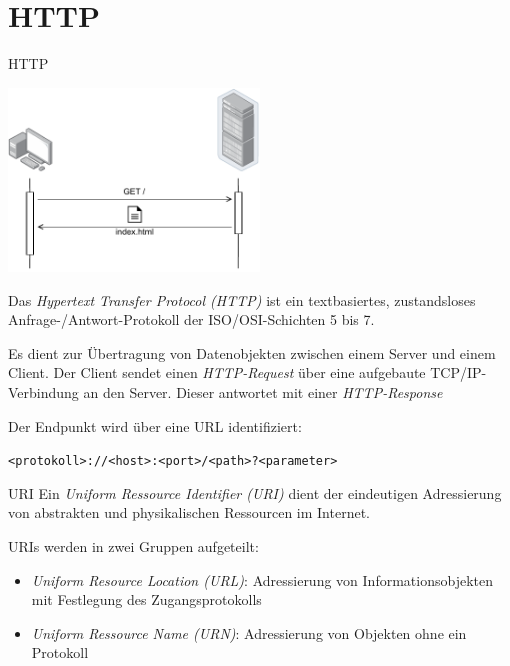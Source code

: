 \section{HTTP}

\begin{defi}{HTTP}
    \begin{center}
        \includegraphics[width=0.5\textwidth]{includes/figures/defi_http.pdf}
    \end{center}

    Das \emph{Hypertext Transfer Protocol (HTTP)} ist ein textbasiertes, zustandsloses Anfrage-/Antwort-Protokoll der ISO/OSI-Schichten 5 bis 7.

    Es dient zur Übertragung von Datenobjekten zwischen einem Server und einem Client.
    Der Client sendet einen \emph{HTTP-Request} über eine aufgebaute TCP/IP-Verbindung an den Server.
    Dieser antwortet mit einer \emph{HTTP-Response}

    Der Endpunkt wird über eine URL identifiziert:

    \centering
    \texttt{<protokoll>://<host>:<port>/<path>?<parameter>}
\end{defi}

\begin{defi}{URI}
    Ein \emph{Uniform Ressource Identifier (URI)} dient der eindeutigen Adressierung von abstrakten und physikalischen Ressourcen im Internet.

    URIs werden in zwei Gruppen aufgeteilt:
    \begin{itemize}
        \item \emph{Uniform Resource Location (URL)}: Adressierung von Informationsobjekten mit Festlegung des Zugangsprotokolls
        \item \emph{Uniform Ressource Name (URN)}: Adressierung von Objekten ohne ein Protokoll
    \end{itemize}
\end{defi}

